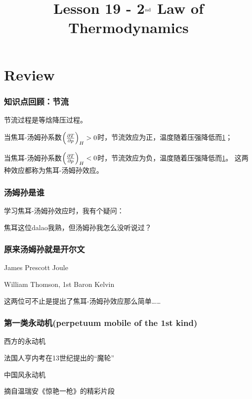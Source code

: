 \documentclass[CJK, 14pt]{beamer}
\title{Lesson 19 - 2$^{\rm nd}$ Law of Thermodynamics}
\author{}
\date{}
\begin{document}
  \bch
{}

\section{Review}

\begin{frame}
\frametitle{知识点回顾：节流}
           {\blue 节流过程是等焓降压过程。}
           
  \bitem
\item{当焦耳-汤姆孙系数$\left(\frac{\partial T}{\partial p}\right)_{H}>0$时，节流效应为正，温度随着压强降低而\uline{1}；}
\item{当焦耳-汤姆孙系数$\left(\frac{\partial T}{\partial p}\right)_{H}<0$时，节流效应为负，温度随着压强降低而\uline{1}。}
  \eitem
  这两种效应都称为{\blue 焦耳-汤姆孙效应}。
\end{frame}  

\begin{frame}
\frametitle{汤姆孙是谁}
学习焦耳-汤姆孙效应时，我有个疑问：

\skipline

焦耳这位dalao我熟，但汤姆孙我怎么没听说过？

\end{frame}

\begin{frame}
\frametitle{原来汤姆孙就是开尔文\bigwulian}

\bitem
\item{James Prescott Joule
  
}
\item{William Thomson, 1st Baron Kelvin 

}
\eitem
这两位可不止是提出了焦耳-汤姆孙效应那么简单……

\end{frame}



\begin{frame}
  \frametitle{第一类永动机(perpetuum mobile of the 1st kind)}

  西方的永动机
  
  
       {\scriptsize 法国人亨内考在13世纪提出的“魔轮”}

  \emini
  中国风永动机



  

  {\scriptsize 摘自温瑞安《惊艳一枪》的精彩片段}

  
  \emini
  
  
\end{frame}
\end{document}
